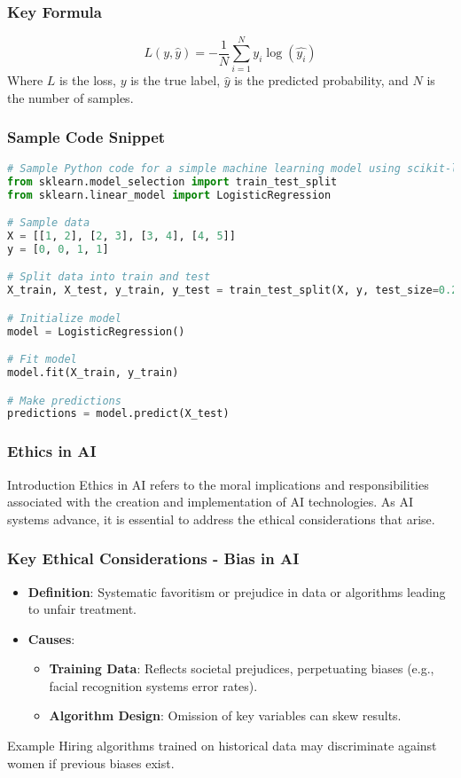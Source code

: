 \documentclass[aspectratio=169]{beamer}
\begin{document}
\begin{frame}[fragile]
    \frametitle{Key Formula}
    \begin{equation}
        L(y, \hat{y}) = -\frac{1}{N} \sum_{i=1}^{N} y_i \log(\hat{y_i})
    \end{equation}
    Where $L$ is the loss, $y$ is the true label, $\hat{y}$ is the predicted probability, and $N$ is the number of samples.
\end{frame}

\begin{frame}[fragile]
    \frametitle{Sample Code Snippet}
    \begin{lstlisting}[language=Python]
# Sample Python code for a simple machine learning model using scikit-learn
from sklearn.model_selection import train_test_split
from sklearn.linear_model import LogisticRegression

# Sample data
X = [[1, 2], [2, 3], [3, 4], [4, 5]]
y = [0, 0, 1, 1]

# Split data into train and test
X_train, X_test, y_train, y_test = train_test_split(X, y, test_size=0.2)

# Initialize model
model = LogisticRegression()

# Fit model
model.fit(X_train, y_train)

# Make predictions
predictions = model.predict(X_test)
    \end{lstlisting}
\end{frame}

\begin{frame}[fragile]
    \frametitle{Ethics in AI}
    \begin{block}{Introduction}
        Ethics in AI refers to the moral implications and responsibilities associated with the creation and implementation of AI technologies. 
        As AI systems advance, it is essential to address the ethical considerations that arise.
    \end{block}
\end{frame}

\begin{frame}[fragile]
    \frametitle{Key Ethical Considerations - Bias in AI}
    \begin{itemize}
        \item \textbf{Definition}: Systematic favoritism or prejudice in data or algorithms leading to unfair treatment.
        \item \textbf{Causes}:
            \begin{itemize}
                \item \textbf{Training Data}: Reflects societal prejudices, perpetuating biases (e.g., facial recognition systems error rates).
                \item \textbf{Algorithm Design}: Omission of key variables can skew results.
            \end{itemize}
    \end{itemize}
    \begin{block}{Example}
        Hiring algorithms trained on historical data may discriminate against women if previous biases exist.
    \end{block}
\end{frame}
\end{document}
